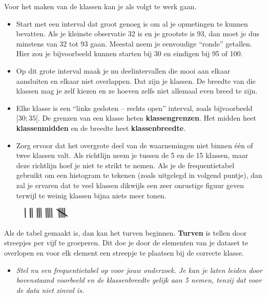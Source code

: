\documentclass[11pt]{article}
\newcommand{\vraag}[2]{\begin{itemize}\item {\it #1} \vspace*{#2}\end{itemize}}
\begin{document}
Voor het maken van de klassen kan je als volgt te werk gaan.
\begin{itemize}
  \item Start met een interval dat groot genoeg is om al je opmetingen te kunnen bevatten. Als je
kleinste observatie 32 is en je grootste is 93, dan moet je dus minstens van 32 tot 93 gaan.
Meestal neem je eenvoudige “ronde” getallen. Hier zou je bijvoorbeeld kunnen starten bij 30
en eindigen bij 95 of 100.
  \item Op dit grote interval maak je nu deelintervallen die mooi aan elkaar aansluiten en elkaar niet
overlappen. Dat zijn je klassen. De breedte van die klassen mag je zelf kiezen en ze hoeven
zelfs niet allemaal even breed te zijn.
  \item Elke klasse is een “links gesloten – rechts open” interval, zoals bijvoorbeeld $[30;35[$. De
grenzen van een klasse heten {\bf klassengrenzen}. Het midden heet {\bf klassenmidden} en de
breedte heet {\bf klassenbreedte}.
  \item Zorg ervoor dat het overgrote deel van de waarnemingen niet binnen één of twee klassen
valt. Als richtlijn neem je tussen de 5 en de 15 klassen, maar deze richtlijn hoef je niet te
strikt te nemen. Als je de frequentietabel gebruikt om een histogram te tekenen (zoals
uitgelegd in volgend puntje), dan zal je ervaren dat te veel klassen dikwijls een zeer onrustige
figuur geven terwijl te weinig klassen bijna niets meer tonen.
\end{itemize}

\begin{figure}
  \includegraphics[width=0.2\textwidth]{turven}
\end{figure}

Als de tabel gemaakt is, dan kan het turven beginnen. {\bf Turven} is tellen door streepjes per vijf te groeperen. Dit doe je door de elementen van je dataset te overlopen en voor elk element een streepje te plaatsen bij de correcte klasse.

\vraag{Stel nu een frequentietabel op voor jouw onderzoek. Je kan je laten leiden door bovenstaand
voorbeeld en de klassenbreedte gelijk aan 5 nemen, tenzij dat voor de data niet zinvol is.}{0cm}
\end{document}
